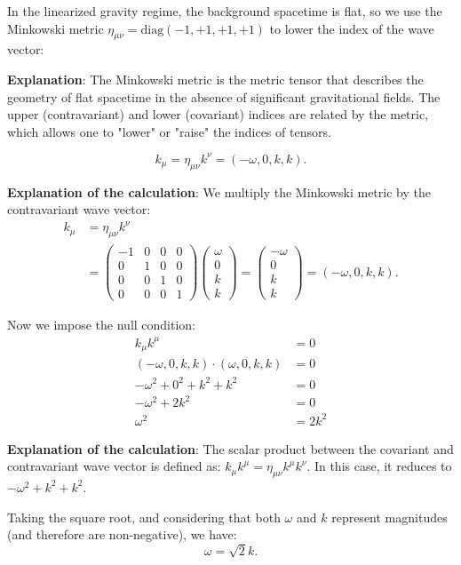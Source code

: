 \documentclass{article}
\begin{document}
In the linearized gravity regime, the background spacetime is flat, so we use the Minkowski metric $\eta_{\mu\nu} = \text{diag}(-1, +1, +1, +1)$ to lower the index of the wave vector:

\textbf{Explanation}: The Minkowski metric is the metric tensor that describes the geometry of flat spacetime in the absence of significant gravitational fields. The upper (contravariant) and lower (covariant) indices are related by the metric, which allows one to "lower" or "raise" the indices of tensors.

\[
k_{\mu} = \eta_{\mu\nu}k^{\nu} = (-\omega, 0, k, k).
\]

\textbf{Explanation of the calculation}:
We multiply the Minkowski metric by the contravariant wave vector:
\begin{align*}
k_{\mu} &= \eta_{\mu\nu}k^{\nu} \\
&= \begin{pmatrix}
-1 & 0 & 0 & 0 \\
0 & 1 & 0 & 0 \\
0 & 0 & 1 & 0 \\
0 & 0 & 0 & 1
\end{pmatrix} \begin{pmatrix}
\omega \\ 0 \\ k \\ k
\end{pmatrix} = \begin{pmatrix}
-\omega \\ 0 \\ k \\ k
\end{pmatrix} = (-\omega, 0, k, k).
\end{align*}

Now we impose the null condition:
\begin{align*}
k_{\mu}k^{\mu} &= 0 \\
(-\omega, 0, k, k) \cdot (\omega, 0, k, k) &= 0 \\
-\omega^2 + 0^2 + k^2 + k^2 &= 0 \\
-\omega^2 + 2k^2 &= 0 \\
\omega^2 &= 2k^2
\end{align*}

\textbf{Explanation of the calculation}: The scalar product between the covariant and contravariant wave vector is defined as:
$k_{\mu}k^{\mu} = \eta_{\mu\nu}k^{\mu}k^{\nu}$. In this case, it reduces to $-\omega^2 + k^2 + k^2$.

Taking the square root, and considering that both $\omega$ and $k$ represent magnitudes (and therefore are non-negative), we have:
\[
\omega = \sqrt{2}k.
\]
\end{document}
